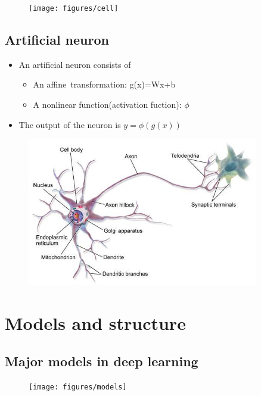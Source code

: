 \begin{figure}[H]
\centering
\texttt{[image: figures/cell]}
\end{figure}




\subsection{Artificial neuron}

\begin{itemize}
\item An artificial neuron consists of
\begin{itemize}
\item An affine transformation:  g(x)=Wx+b

\item A nonlinear function(activation fuction): $\phi$
\end{itemize}
\item The output of the neuron is $y=\phi(g(x))$
\end{itemize}

\begin{figure}[H]
\centering
\includegraphics[width=0.9\textwidth]{figures/neuron}
\end{figure}



\section{Models and structure}
\subsection{Major models in deep learning}
\begin{figure}[H]
\centering
\texttt{[image: figures/models]}
\end{figure}



